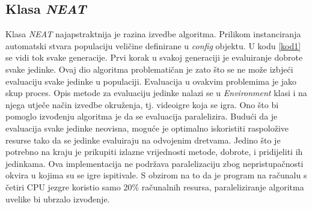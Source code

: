 \documentclass[times, utf8, diplomski, numeric]{fer}
\begin{document}
\subsection{Klasa \textit{NEAT}}
Klasa \textit{NEAT} najapstraktnija je razina izvedbe algoritma. Prilikom instanciranja automatski stvara populaciju veličine definirane u \textit{config} objektu. U kodu \ref{kod1} se vidi tok svake generacije. Prvi korak u svakoj generaciji je evaluiranje dobrote svake jedinke. Ovaj dio algoritma problematičan je zato što se ne može izbjeći evaluaciju svake jedinke u populaciji. Evaluacija u ovakvim problemima je jako skup proces. Opis metode za evaluaciju jedinke nalazi se u \textit{Environment} klasi i na njega utječe način izvedbe okruženja, tj. videoigre koja se igra. Ono što bi pomoglo izvođenju algoritma je da se evaluacija paralelizira. Budući da je evaluacija svake jedinke neovisna, moguće je optimalno iskoristiti raspoložive resurse tako da se jedinke evaluiraju na odvojenim dretvama. Jedino što je potrebno na kraju je prikupiti izlazne vrijednosti metode, dobrote, i pridijeliti ih jedinkama. Ova implementacija ne podržava paralelizaciju zbog nepristupačnosti okvira u kojima su se igre ispitivale. S obzirom na to da je program na računalu s četiri CPU jezgre koristio samo 20\% računalnih resursa, paraleliziranje algoritma uvelike bi ubrzalo izvođenje.
\end{document}
